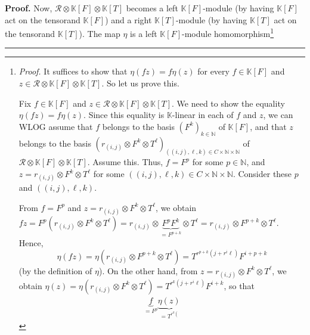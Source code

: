 \documentclass[numbers=enddot,12pt,final,onecolumn,notitlepage]{scrartcl}%
\theoremstyle{definition}
\newenvironment{proof}[1][Proof]{\noindent\textbf{#1.} }{\ \rule{0.5em}{0.5em}}
\begin{document}
\begin{proof}
Now, $\mathcal{R}\otimes\mathbb{K}\left[  F\right]  \otimes\mathbb{K}\left[
T\right]  $ becomes a left $\mathbb{K}\left[  F\right]  $-module (by having
$\mathbb{K}\left[  F\right]  $ act on the tensorand $\mathbb{K}\left[
F\right]  $) and a right $\mathbb{K}\left[  T\right]  $-module (by having
$\mathbb{K}\left[  T\right]  $ act on the tensorand $\mathbb{K}\left[
T\right]  $). The map $\eta$ is a left $\mathbb{K}\left[  F\right]  $-module
homomorphism\footnote{\textit{Proof.} It suffices to show that $\eta\left(
fz\right)  =f\eta\left(  z\right)  $ for every $f\in\mathbb{K}\left[
F\right]  $ and $z\in\mathcal{R}\otimes\mathbb{K}\left[  F\right]
\otimes\mathbb{K}\left[  T\right]  $. So let us prove this.
\par
Fix $f\in\mathbb{K}\left[  F\right]  $ and $z\in\mathcal{R}\otimes
\mathbb{K}\left[  F\right]  \otimes\mathbb{K}\left[  T\right]  $. We need to
show the equality $\eta\left(  fz\right)  =f\eta\left(  z\right)  $. Since
this equality is $\mathbb{K}$-linear in each of $f$ and $z$, we can WLOG
assume that $f$ belongs to the basis $\left(  F^{k}\right)  _{k\in\mathbb{N}}$
of $\mathbb{K}\left[  F\right]  $, and that $z$ belongs to the basis $\left(
r_{\left(  i,j\right)  }\otimes F^{k}\otimes T^{\ell}\right)  _{\left(
\left(  i,j\right)  ,\ell,k\right)  \in C\times\mathbb{N}\times\mathbb{N}}$ of
$\mathcal{R}\otimes\mathbb{K}\left[  F\right]  \otimes\mathbb{K}\left[
T\right]  $. Assume this. Thus, $f=F^{p}$ for some $p\in\mathbb{N}$, and
$z=r_{\left(  i,j\right)  }\otimes F^{k}\otimes T^{\ell}$ for some $\left(
\left(  i,j\right)  ,\ell,k\right)  \in C\times\mathbb{N}\times\mathbb{N}$.
Consider these $p$ and $\left(  \left(  i,j\right)  ,\ell,k\right)  $.
\par
From $f=F^{p}$ and $z=r_{\left(  i,j\right)  }\otimes F^{k}\otimes T^{\ell}$,
we obtain $fz=F^{p}\left(  r_{\left(  i,j\right)  }\otimes F^{k}\otimes
T^{\ell}\right)  =r_{\left(  i,j\right)  }\otimes\underbrace{F^{p}F^{k}%
}_{=F^{p+k}}\otimes T^{\ell}=r_{\left(  i,j\right)  }\otimes F^{p+k}\otimes
T^{\ell}$. Hence,%
\[
\eta\left(  fz\right)  =\eta\left(  r_{\left(  i,j\right)  }\otimes
F^{p+k}\otimes T^{\ell}\right)  =T^{r^{p+k}\left(  j+r^{i}\ell\right)
}F^{i+p+k}%
\]
(by the definition of $\eta$). On the other hand, from $z=r_{\left(
i,j\right)  }\otimes F^{k}\otimes T^{\ell}$, we obtain $\eta\left(  z\right)
=\eta\left(  r_{\left(  i,j\right)  }\otimes F^{k}\otimes T^{\ell}\right)
=T^{r^{k}\left(  j+r^{i}\ell\right)  }F^{i+k}$, so that%
\begin{align*}
\underbrace{f}_{=F^{p}}\underbrace{\eta\left(  z\right)  }_{=T^{r^{k}\left(
}}
\end{align*}}
\end{proof}
\end{document}
